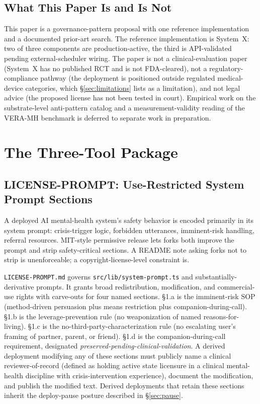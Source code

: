 \documentclass[letterpaper]{article} %
\begin{document}
\subsection{What This Paper Is and Is Not}

This paper is a governance-pattern proposal with one reference implementation and a documented prior-art search. The reference implementation is System~X: two of three components are production-active, the third is API-validated pending external-scheduler wiring. The paper is not a clinical-evaluation paper (System~X has no published RCT and is not FDA-cleared), not a regulatory-compliance pathway (the deployment is positioned outside regulated medical-device categories, which \S\ref{sec:limitations} lists as a limitation), and not legal advice (the proposed license has not been tested in court). Empirical work on the substrate-level anti-pattern catalog and a measurement-validity reading of the VERA-MH benchmark \citep{bentley2026veramh} is deferred to separate work in preparation.

\section{The Three-Tool Package}
\label{sec:package}

\subsection{LICENSE-PROMPT: Use-Restricted System Prompt Sections}
\label{sec:license}

A deployed AI mental-health system's safety behavior is encoded primarily in its system prompt: crisis-trigger logic, forbidden utterances, imminent-risk handling, referral resources. MIT-style permissive release lets forks both improve the prompt and strip safety-critical sections. A README note asking forks not to strip is unenforceable; a copyright-license-level constraint is.

\texttt{LICENSE-PROMPT.md} governs \texttt{src/lib/system-prompt.ts} and substantially-derivative prompts. It grants broad redistribution, modification, and commercial-use rights with carve-outs for four named sections. \S1.a is the imminent-risk SOP (method-driven persuasion plus means restriction plus companion-during-call). \S1.b is the leverage-prevention rule (no weaponization of named reasons-for-living). \S1.c is the no-third-party-characterization rule (no escalating user's framing of partner, parent, or friend). \S1.d is the companion-during-call requirement, designated \emph{preserved-pending-clinical-validation}. A derived deployment modifying any of these sections must publicly name a clinical reviewer-of-record (defined as holding active state licensure in a clinical mental-health discipline with crisis-intervention experience), document the modification, and publish the modified text. Derived deployments that retain these sections inherit the deploy-pause posture described in \S\ref{sec:pause}.
\end{document}
